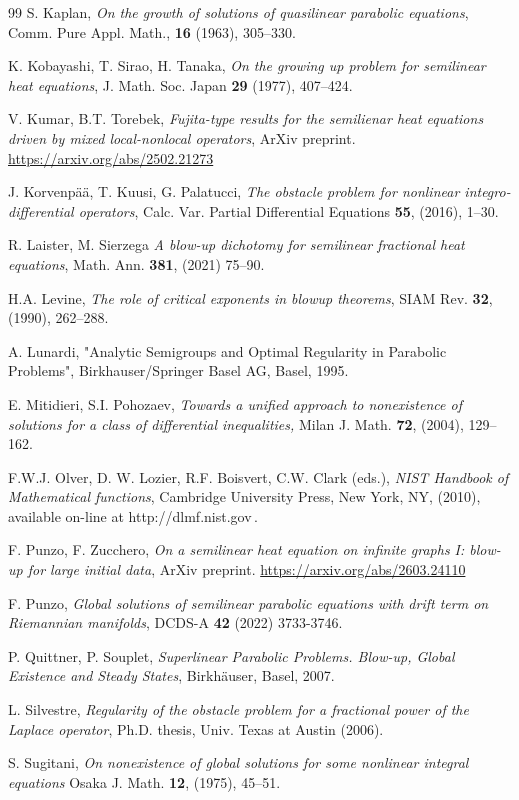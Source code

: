 \documentclass[11pt,a4paper,reqno]{amsart}
\theoremstyle{definition}
\theoremstyle{plain}
\numberwithin{equation}{section}
\begin{document}
\begin{thebibliography}{99}
 S. Kaplan, {\it On the growth of solutions of quasilinear parabolic equations}, Comm. Pure Appl.
Math., {\bf 16} (1963), 305--330.

 K. Kobayashi, T. Sirao, H. Tanaka, {\it On the growing up problem for semilinear heat equations}, J. Math. Soc.
Japan {\bf 29} (1977), 407--424.


 V. Kumar, B.T. Torebek, {\it Fujita-type results for the semilienar heat equations driven by mixed local-nonlocal operators}, 	ArXiv preprint. \url{https://arxiv.org/abs/2502.21273} 

J. Korvenp\"{a}\"{a}, T. Kuusi, G. Palatucci,
{\it The obstacle problem for nonlinear integro-differential operators},
Calc. Var. Partial Differential Equations {\bf 55}, (2016), 1--30.

 R. Laister, M. Sierzega {\it A blow-up dichotomy for semilinear fractional heat equations}, Math. Ann. {\bf  381}, (2021) 75--90.

 H.A. Levine, {\it The role of critical exponents in blowup theorems}, SIAM Rev. {\bf 32}, (1990), 262--288.

 A. Lunardi, "Analytic Semigroups and Optimal Regularity in Parabolic Problems",
Birkhauser/Springer Basel AG, Basel, 1995.


 E. Mitidieri, S.I. Pohozaev, {\it Towards a unified approach to nonexistence of solutions for a class of differential inequalities,} Milan J. Math. {\bf 72}, (2004), 129--162.

F.W.J. Olver, D. W. Lozier, R.F. Boisvert, C.W. Clark (eds.),
\emph{NIST Handbook of Mathematical functions}, Cambridge University Press, New York, NY, (2010), available on-line at http://dlmf.nist.gov\,.


F. Punzo, F. Zucchero,
{\em On a semilinear heat equation on infinite graphs I: blow-up for large initial data},
ArXiv preprint. \url{https://arxiv.org/abs/2603.24110}


 F. Punzo, {\it Global solutions of semilinear parabolic equations with drift term on Riemannian manifolds}, DCDS-A {\bf 42} (2022) 3733-3746.

 P. Quittner, P. Souplet,
 {\it Superlinear Parabolic Problems.
Blow-up, Global Existence and Steady States}, Birkh\"auser, Basel, 2007.


 L. Silvestre, {\it Regularity of the obstacle problem for a fractional power of the Laplace operator}, Ph.D. thesis, Univ. Texas at Austin (2006).

 S. Sugitani, {\it
On nonexistence of global solutions for some nonlinear integral equations}
Osaka J. Math. {\bf 12}, (1975), 45--51.



 \end{thebibliography}
\end{document}
